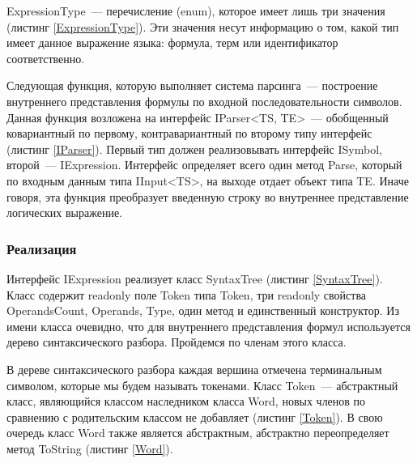 ExpressionType~--- перечисление (enum), которое имеет лишь три значения (листинг \ref{ExpressionType}). Эти значения несут информацию о том, какой тип имеет данное выражение языка: формула, терм или идентификатор соответственно.





Следующая функция, которую выполняет система парсинга~--- построение внутреннего представления формулы по входной последовательности символов. Данная функция возложена на интерфейс IParser<TS, TE>~--- обобщенный ковариантный по первому, контравариантный по второму типу интерфейс (листинг \ref{IParser}). Первый тип должен реализовывать интерфейс ISymbol, второй~--- IExpression. Интерфейс определяет всего один метод Parse, который по входным данным типа IInput<TS>, на выходе отдает объект типа TE. Иначе говоря, эта функция преобразует введенную строку во внутреннее представление логических выражение.



\subsubsection{Реализация}

Интерфейс IExpression реализует класс SyntaxTree (листинг \ref{SyntaxTree}). Класс содержит readonly поле Token типа Token, три readonly свойства OperandsCount, Operands, Type, один метод и единственный конструктор. Из имени класса очевидно, что для внутреннего представления формул используется дерево синтаксического разбора. Пройдемся по членам этого класса.

В дереве синтаксического разбора каждая вершина отмечена терминальным символом, которые мы будем называть токенами. Класс Token~--- абстрактный класс, являющийся классом наследником класса Word, новых членов по сравнению с родительским классом не добавляет (листинг \ref{Token}). В свою очередь класс Word также является абстрактным, абстрактно переопределяет метод ToString (листинг \ref{Word}).



